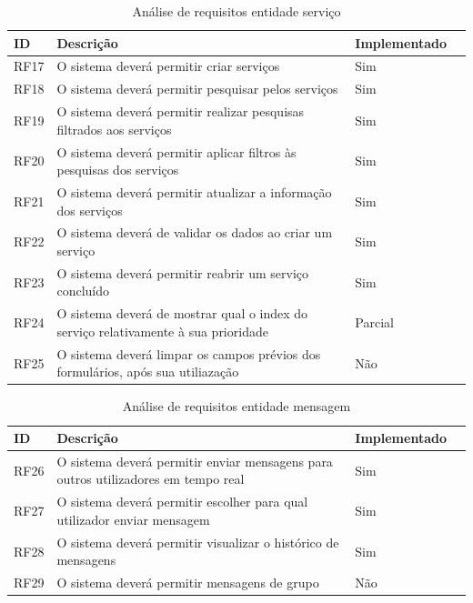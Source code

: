 \documentclass[a4paper,12pt]{article} %
\begin{document}
\begin{table}[H]
	\centering
	\begin{tabular}{|l|p{12cm}|l|r|}
		\hline
		\textbf{ID} & \textbf{Descrição} & \textbf{Implementado}\\
		\hline
		RF17 & O sistema deverá permitir criar serviços & Sim \\
		\hline
		RF18 & O sistema deverá permitir pesquisar pelos serviços & Sim \\
		\hline
		RF19 & O sistema deverá permitir realizar pesquisas filtrados aos serviços & Sim \\
		\hline
		RF20 & O sistema deverá permitir aplicar filtros às pesquisas dos serviços & Sim \\
		\hline
		RF21 & O sistema deverá permitir atualizar a informação dos serviços & Sim \\
		\hline
		RF22 & O sistema deverá de validar os dados ao criar um serviço & Sim \\
		\hline
		RF23 & O sistema deverá permitir reabrir um serviço concluído & Sim \\
		\hline
		RF24 & O sistema deverá de mostrar qual o index do serviço relativamente à sua prioridade & Parcial\footnotemark \\
		\hline
		RF25 & O sistema deverá limpar os campos prévios dos formulários, após sua utiliazação & Não \\
		\hline
	\end{tabular}
	\caption{Análise de requisitos entidade serviço}
\end{table}

\begin{table}[H]
	\centering
	\begin{tabular}{|l|p{12cm}|l|r|}
		\hline
		\textbf{ID} & \textbf{Descrição} & \textbf{Implementado}\\
		\hline
		RF26 & O sistema deverá permitir enviar mensagens para outros utilizadores em tempo real & Sim \\
		\hline
		RF27 & O sistema deverá permitir escolher para qual utilizador enviar mensagem & Sim \\
		\hline
		RF28 & O sistema deverá permitir visualizar o histórico de mensagens & Sim \\
		\hline
		RF29 & O sistema deverá permitir mensagens de grupo & Não \\
		\hline
	\end{tabular}
	\caption{Análise de requisitos entidade mensagem}
\end{table}
\end{document}

